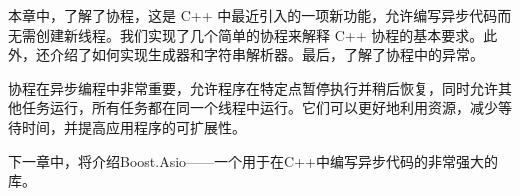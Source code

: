 本章中，了解了协程，这是 C++ 中最近引入的一项新功能，允许编写异步代码而无需创建新线程。我们实现了几个简单的协程来解释 C++ 协程的基本要求。此外，还介绍了如何实现生成器和字符串解析器。最后，了解了协程中的异常。

协程在异步编程中非常重要，允许程序在特定点暂停执行并稍后恢复，同时允许其他任务运行，所有任务都在同一个线程中运行。它们可以更好地利用资源，减少等待时间，并提高应用程序的可扩展性。

下一章中，将介绍Boost.Asio——一个用于在C++中编写异步代码的非常强大的库。
